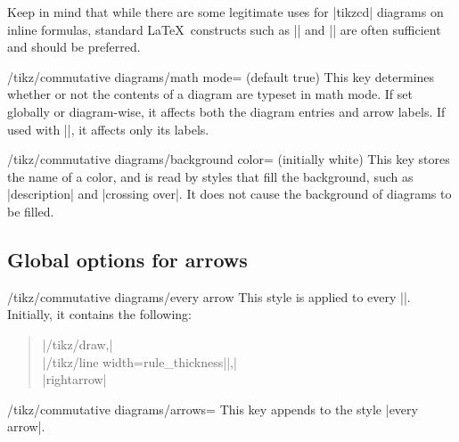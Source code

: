 \documentclass[a4paper]{ltxdoc}
\begin{document}
Keep in mind that while there are some legitimate uses for |{tikzcd}|
diagrams on inline formulas, standard \LaTeX\ constructs such as
|\overset| and |\xrigthtarrow| are often sufficient and should be
preferred.

\begin{key}{/tikz/commutative diagrams/math mode=
     (default true)}
   This key determines whether or not the contents of a diagram are
   typeset in math mode.  If set globally or diagram-wise, it affects
   both the diagram entries and arrow labels.  If used with |\arrow|,
   it affects only its labels.
\end{key}

\begin{key}{/tikz/commutative diagrams/background color= (initially white)}
  This key stores the name of a color, and is read by 
  styles that fill the background, such as |description| and |crossing over|.
  It does not cause the background of diagrams to be filled.
\end{key}

\subsection{Global options for arrows}
\label{sec:options-arrows}

\begin{stylekey}{/tikz/commutative diagrams/every arrow}
  This style is applied to every |\arrow|.  Initially, it contains the
  following:
\begin{verse}
|/tikz/draw,|\\
|/tikz/line width=rule_thickness||,|\\
|rightarrow|
\end{verse}
\end{stylekey}

\begin{key}{/tikz/commutative diagrams/arrows=}
  This key appends  to the style |every arrow|.
\end{key}
\end{document}
